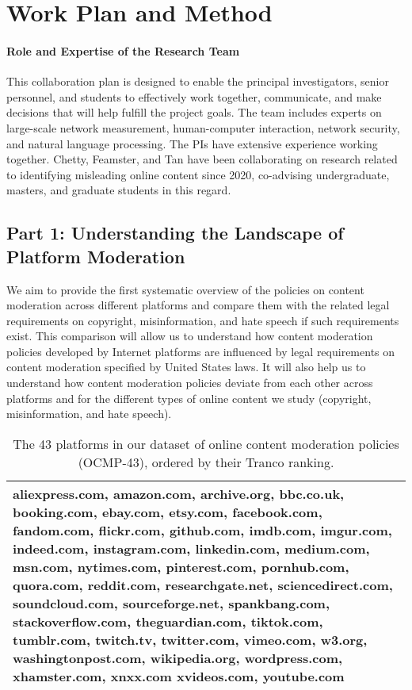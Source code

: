 \section{Work Plan and Method}
\label{sec:work-plan}

\paragraph{Role and Expertise of the Research Team} This collaboration plan is
designed to enable the principal investigators, senior personnel, and students
to effectively work together, communicate, and make decisions that will help
fulfill the project goals. The team includes experts on large-scale network
measurement, human-computer interaction, network security, and natural
language processing. The PIs have extensive experience working
together. Chetty, Feamster, and Tan have been collaborating on research
related to identifying misleading online content since 2020, co-advising
undergraduate, masters, and graduate students in this regard.


\subsection{Part 1: Understanding the Landscape of Platform Moderation}
\label{sec:landscape}

We aim to provide the first systematic overview
of the policies on content moderation across different platforms and compare
them with the related legal requirements on copyright, misinformation, and hate speech if such requirements exist.
This comparison will allow us to understand how content moderation policies
developed by Internet platforms are influenced by legal requirements on
content moderation specified by United States laws. It will also help us to
understand how content moderation policies deviate from each other across
platforms and for the different types of online content we study (copyright,
misinformation, and hate speech).


\begin{table}[t]
    \begin{tabular}{|p{6in}|}
\hline
aliexpress.com, 
amazon.com, 
archive.org,
bbc.co.uk, 
booking.com,
ebay.com, 
etsy.com, 
facebook.com, 
fandom.com, 
flickr.com,
github.com, 
imdb.com, 
imgur.com, 
indeed.com, 
instagram.com,
linkedin.com, 
medium.com, 
msn.com, 
nytimes.com, 
pinterest.com,
pornhub.com, 
quora.com, 
reddit.com, 
researchgate.net, 
sciencedirect.com, 
soundcloud.com,
sourceforge.net, 
spankbang.com, 
stackoverflow.com, 
theguardian.com, 
tiktok.com,
tumblr.com, 
twitch.tv, 
twitter.com, 
vimeo.com, 
w3.org,
washingtonpost.com,
wikipedia.org, 
wordpress.com, 
xhamster.com, 
xnxx.com 
xvideos.com, 
youtube.com
\\ \hline
\end{tabular}
\caption{The 43 platforms in our dataset of online content moderation policies (OCMP-43), ordered by their Tranco ranking.}
\label{tab:platformlist}
\end{table}

